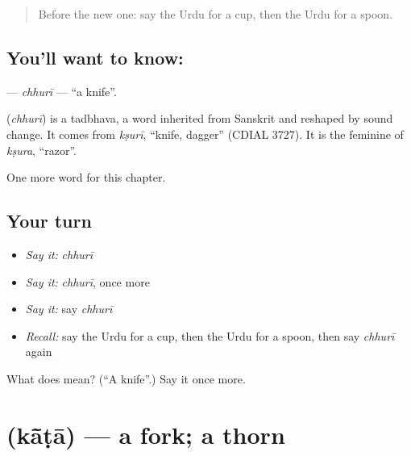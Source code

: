 \label{lesson:UR-C60-chhuri}



\begin{quote}
Before the new one: say the Urdu for a cup, then the Urdu for a spoon.
\end{quote}

\subsection*{You'll want to know: }
\textbf{} — \emph{chhurī} — \textquotedblleft{}a knife\textquotedblright{}.

\begin{cousinweb}
\textbf{} (\emph{chhurī}) is a tadbhava, a word inherited from Sanskrit and reshaped by sound change. It comes from \emph{kṣurī}, \textquotedblleft{}knife, dagger\textquotedblright{} (CDIAL 3727). It is the feminine of \emph{kṣura}, \textquotedblleft{}razor\textquotedblright{}.
\end{cousinweb}

\begin{grammarlens}[title={What you've built}]
One more word for this chapter.
\end{grammarlens}

\subsection*{Your turn}
\begin{itemize}
\raggedright
  \item \emph{Say it:} \emph{chhurī}
  \item \emph{Say it:} \emph{chhurī}, once more
  \item \emph{Say it:} say \emph{chhurī}
  \item \emph{Recall:} say the Urdu for a cup, then the Urdu for a spoon, then say \emph{chhurī} again
\end{itemize}

\begin{tcolorbox}[breakable,colback=teal!4,colframe=teal!35!black,title={Before you move on}]
What does  mean? (\textquotedblleft{}A knife\textquotedblright{}.) Say it once more.
\end{tcolorbox}
\section[\texorpdfstring{\ur{کانٹا} (kā̃ṭā)}{کانٹا (kā̃ṭā)}]{ (kā̃ṭā) — a fork; a thorn}

